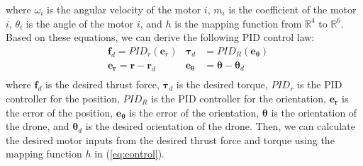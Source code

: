 where $\omega_i$ is the angular velocity of the motor $i$, $m_i$ is the coefficient of the motor $i$, $\theta_i$ is the angle of the motor $i$, and $h$ is the mapping function from $\mathbb{R}^4$ to $\mathbb{R}^6$.
Based on these equations, we can derive the following PID control law:
\begin{equation}
  \begin{aligned}
    &\bm{f}_d = {PID}_r(\bm{e}_r)
    &\bm{\tau}_d &= {PID}_R(\bm{e_\theta})\\
    &\bm{e_r} = \bm{r} - \bm{r}_d
    &\bm{e_\theta} &= \bm{\theta} - \bm{\theta}_d\\
  \end{aligned}
\end{equation}
where $\bm{f}_d$ is the desired thrust force, 
$\bm{\tau}_d$ is the desired torque, 
$PID_r$ is the PID controller for the position, 
$PID_R$ is the PID controller for the orientation, 
$\bm{e_r}$ is the error of the position, 
$\bm{e_\theta}$ is the error of the orientation, 
$\bm{\theta}$ is the orientation of the drone, 
and $\bm{\theta}_d$ is the desired orientation of the drone.
Then, we can calculate the desired motor inputs from the desired thrust force and torque using the mapping function $h$ in (\ref{eq:control}).